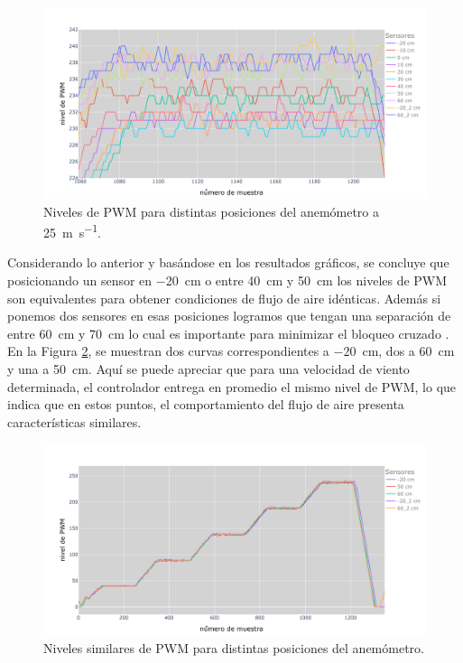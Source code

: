 \begin{figure}[H]
    \centering
    \includegraphics[width=0.95\linewidth]{Figuras/resultados/caracterizacion/pwmCaract25.png}
    \caption{Niveles de PWM para distintas posiciones del anemómetro a \SI{25}{\meter\per\second}.}
    \label{fig:pwmCaract25}
\end{figure}
Considerando lo anterior y basándose en los resultados gráficos, se concluye que posicionando un sensor en \SI{-20}{\centi\meter} o entre \SI{40}{\centi\meter} y \SI{50}{\centi\meter} los niveles de PWM son equivalentes para obtener condiciones de flujo de aire idénticas. Además si ponemos dos sensores en esas posiciones logramos que tengan una separación de entre \SI{60}{\centi\meter} y \SI{70}{\centi\meter} lo cual es importante para minimizar el bloqueo cruzado \cite{IEC61400-12-1} \cite{ISO16622}. En la Figura \ref{fig:pwmCaractOptima}, se muestran dos curvas correspondientes a \SI{-20}{\centi\meter}, dos a \SI{60}{\centi\meter} y una a \SI{50}{\centi\meter}. Aquí se puede apreciar que para una velocidad de viento determinada, el controlador entrega en promedio el mismo nivel de PWM, lo que indica que en estos puntos, el comportamiento del flujo de aire presenta características similares.

\begin{figure}[H]
    \centering
    \includegraphics[width=0.95\linewidth]{Figuras/resultados/caracterizacion/pwmCaractOptima.png}
    \caption{Niveles similares de PWM para distintas posiciones del anemómetro.}
    \label{fig:pwmCaractOptima}
\end{figure}


